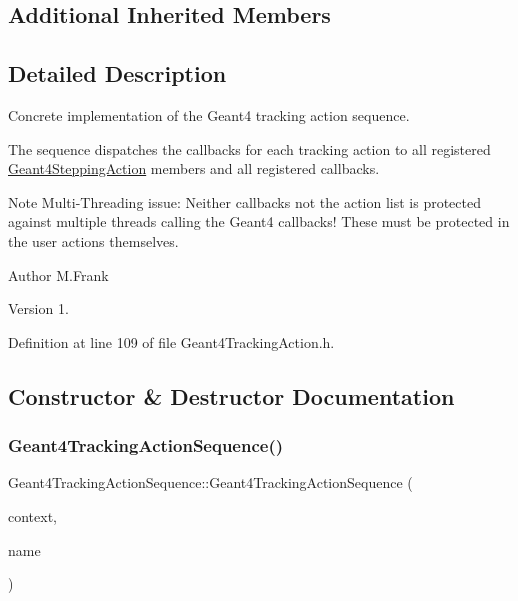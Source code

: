 \subsection*{Additional Inherited Members}


\subsection{Detailed Description}
Concrete implementation of the Geant4 tracking action sequence. 

The sequence dispatches the callbacks for each tracking action to all registered \hyperlink{class_d_d4hep_1_1_simulation_1_1_geant4_stepping_action}{Geant4\+Stepping\+Action} members and all registered callbacks.

Note Multi-\/\+Threading issue\+: Neither callbacks not the action list is protected against multiple threads calling the Geant4 callbacks! These must be protected in the user actions themselves.

\begin{DoxyAuthor}{Author}
M.\+Frank 
\end{DoxyAuthor}
\begin{DoxyVersion}{Version}
1. 
\end{DoxyVersion}


Definition at line 109 of file Geant4\+Tracking\+Action.\+h.



\subsection{Constructor \& Destructor Documentation}
\hypertarget{class_d_d4hep_1_1_simulation_1_1_geant4_tracking_action_sequence_aea13a63c92a90e23145f5b2ab1f96c6e}{}\label{class_d_d4hep_1_1_simulation_1_1_geant4_tracking_action_sequence_aea13a63c92a90e23145f5b2ab1f96c6e} 
\subsubsection{\texorpdfstring{Geant4\+Tracking\+Action\+Sequence()}{Geant4TrackingActionSequence()}}
{\footnotesize\ttfamily Geant4\+Tracking\+Action\+Sequence\+::\+Geant4\+Tracking\+Action\+Sequence (\begin{DoxyParamCaption}\item[{\hyperlink{class_d_d4hep_1_1_simulation_1_1_geant4_context}{Geant4\+Context} $\ast$}]{context,  }\item[{const std\+::string \&}]{name }\end{DoxyParamCaption})}




